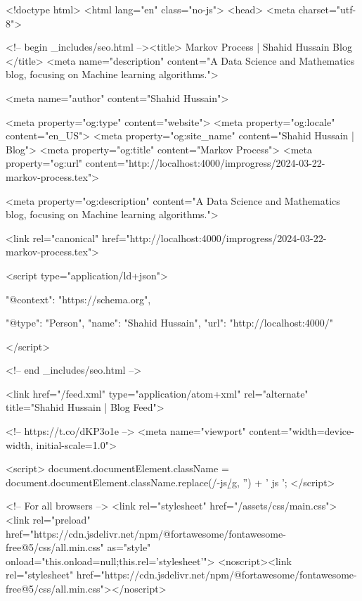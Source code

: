 <!doctype html>
<html lang="en" class="no-js">
  <head>
    <meta charset="utf-8">

<!-- begin _includes/seo.html --><title>            Markov Process | Shahid Hussain      Blog      </title>
<meta name="description" content="A Data Science and Mathematics blog, focusing on Machine learning algorithms.">


  <meta name="author" content="Shahid Hussain">
  


<meta property="og:type" content="website">
<meta property="og:locale" content="en_US">
<meta property="og:site_name" content="Shahid Hussain | Blog">
<meta property="og:title" content="Markov Process">
<meta property="og:url" content="http://localhost:4000/improgress/2024-03-22-markov-process.tex">


  <meta property="og:description" content="A Data Science and Mathematics blog, focusing on Machine learning algorithms.">












<link rel="canonical" href="http://localhost:4000/improgress/2024-03-22-markov-process.tex">




<script type="application/ld+json">
  {
    "@context": "https://schema.org",
    
      "@type": "Person",
      "name": "Shahid Hussain",
      "url": "http://localhost:4000/"
    
  }
</script>







<!-- end _includes/seo.html -->



  <link href="/feed.xml" type="application/atom+xml" rel="alternate" title="Shahid Hussain | Blog Feed">


<!-- https://t.co/dKP3o1e -->
<meta name="viewport" content="width=device-width, initial-scale=1.0">

<script>
  document.documentElement.className = document.documentElement.className.replace(/\bno-js\b/g, '') + ' js ';
</script>

<!-- For all browsers -->
<link rel="stylesheet" href="/assets/css/main.css">
<link rel="preload" href="https://cdn.jsdelivr.net/npm/@fortawesome/fontawesome-free@5/css/all.min.css" as="style" onload="this.onload=null;this.rel='stylesheet'">
<noscript><link rel="stylesheet" href="https://cdn.jsdelivr.net/npm/@fortawesome/fontawesome-free@5/css/all.min.css"></noscript>




